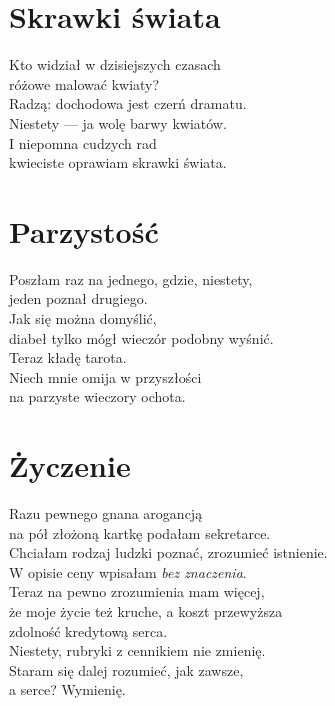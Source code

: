 \documentclass[12pt, a4paper]{memoir}
\begin{document}
\newpage
\section{Skrawki świata}

\begin{flushleft}
Kto widział w dzisiejszych czasach\\
różowe malować kwiaty?\\
Radzą: dochodowa jest czerń dramatu.\\[\baselineskip]

Niestety — ja wolę barwy kwiatów.\\
I niepomna cudzych rad\\
kwieciste oprawiam skrawki świata.
\end{flushleft}

\newpage
\section{Parzystość}

\begin{flushleft}
Poszłam raz na jednego, gdzie, niestety,\\
jeden poznał drugiego.\\
Jak się można domyślić,\\
diabeł tylko mógł wieczór podobny wyśnić.\\[\baselineskip]

Teraz kładę tarota.\\
Niech mnie omija w przyszłości\\
na parzyste wieczory ochota.
\end{flushleft}

\newpage

\section{Życzenie}

\begin{flushleft}
Razu pewnego gnana arogancją\\
na pół złożoną kartkę podałam sekretarce.\\[\baselineskip]

Chciałam rodzaj ludzki poznać, zrozumieć istnienie.\\
W opisie ceny wpisałam \textit{bez znaczenia}.\\[\baselineskip]

Teraz na pewno zrozumienia mam więcej,\\
że moje życie też kruche, a koszt przewyższa\\
zdolność kredytową serca.\\[\baselineskip]

Niestety, rubryki z cennikiem nie zmienię.\\
Staram się dalej rozumieć, jak zawsze,\\
a serce? Wymienię.
\end{flushleft}
\end{document}
